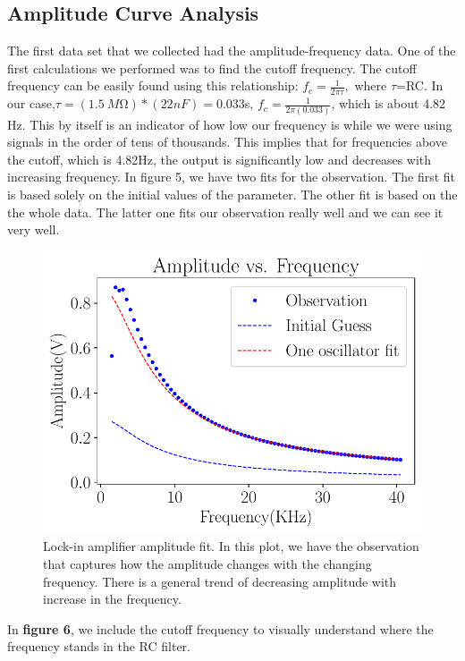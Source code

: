 \documentclass[twocolumn]{article}\usepackage[english]{babel}
\begin{document}
\subsection{Amplitude Curve Analysis}
The first data set that we collected had the amplitude-frequency data. One of the first calculations we performed was to find the cutoff frequency.
The cutoff frequency can be easily found using this relationship:
\(f_{c}=\frac{1}{2\pi\tau}, \) where $\tau$=RC. \newline
In our case,\(\tau=(\SI{1.5}{M\ohm})*(22nF)=0.033\)s, \newline
\(f_c=\frac{1}{2\pi(0.033)}\), which is about 4.82 Hz. This by itself is an indicator of how low our frequency is while we were using signals in the order of tens of thousands. This implies that for frequencies above the cutoff, which is 4.82Hz, the output is significantly low and decreases with increasing frequency.
In figure 5, we have two fits for the observation. The first fit is based solely on the initial values of the parameter. The other fit is based on the the whole data. The latter one fits our observation really well and we can see it very well.
\begin{figure}
\includegraphics[width=\linewidth]{images/v2/LA_Amplitude_Fit.pdf}
\caption{Lock-in amplifier amplitude fit. In this plot, we have the observation that captures how the amplitude changes with the changing frequency. There is a general trend of decreasing amplitude with increase in the frequency. }
  \label{fig:LA Ampt fit}
\end{figure}
In \textbf{figure 6}, we include the cutoff frequency to visually understand where the frequency stands in the RC filter.
\end{document}
